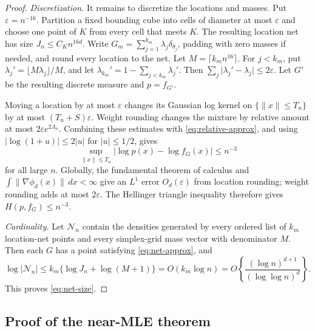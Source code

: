 \documentclass[11pt]{article}
\theoremstyle{definition}
\theoremstyle{remark}
\newcommand{\Ncal}{\mathcal N}
\newcommand{\norm}[1]{\lVert #1\rVert}
\newcommand{\abs}[1]{\lvert #1\rvert}
\newcommand{\eps}{\varepsilon}
\begin{document}
\begin{proof}
\emph{Discretization.}  It remains to discretize the locations and masses.
Put $\eps=n^{-16}$.  Partition a fixed bounding cube into cells of diameter
at most $\eps$ and choose one point of $K$ from every cell that meets $K$.
The resulting location net has size $J_n\le C_Kn^{16d}$.  Write
$G_m=\sum_{j=1}^{k_m}\lambda_j\delta_{\theta_j}$, padding with zero masses if
needed, and round every location to the net.  Let $M=\lceil k_mn^{16}\rceil$.
For $j<k_m$, put $\lambda_j'=\lfloor M\lambda_j\rfloor/M$, and let
$\lambda_{k_m}'=1-\sum_{j<k_m}\lambda_j'$.  Then
$\sum_j\abs{\lambda_j'-\lambda_j}\le2\eps$.  Let $G'$ be the resulting
discrete measure and $p=f_{G'}$.

Moving a location by at most $\eps$ changes its Gaussian log kernel on
$\{\norm{x}\le T_n\}$ by at most $(T_n+S)\eps$.  Weight rounding changes the
mixture by relative amount at most $2\eps e^{2\Lambda_n}$.  Combining these
estimates with \eqref{eq:relative-approx}, and using
$\abs{\log(1+u)}\le2\abs{u}$ for $\abs{u}\le1/2$, gives
\[
 \sup_{\norm{x}\le T_n}\abs{\log p(x)-\log f_G(x)}\le n^{-3}
\]
for all large $n$.  Globally, the fundamental theorem of calculus and
$\int\norm{\nabla\phi_d(x)}\,dx<\infty$ give an $L^1$ error $O_d(\eps)$ from
location rounding; weight rounding adds at most $2\eps$.  The Hellinger
triangle inequality therefore gives $H(p,f_G)\le n^{-3}$.

\emph{Cardinality.}  Let $\Ncal_n$ contain the densities generated by every
ordered list of $k_m$ location-net points and every simplex-grid mass vector
with denominator $M$.  Then each $G$ has a point satisfying
\eqref{eq:net-approx}, and
\[
 \log\abs{\Ncal_n}
 \le k_m\{\log J_n+\log(M+1)\}
 =O(k_m\log n)
 =O\left\{\frac{(\log n)^{d+1}}{(\log\log n)^d}\right\}.
\]
This proves \eqref{eq:net-size}.
\end{proof}

\subsection{Proof of the near-MLE theorem}
\end{document}
